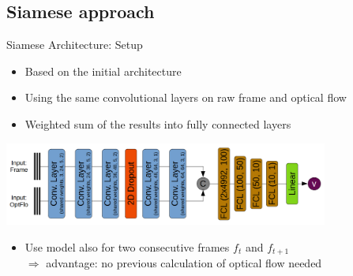 \subsection{Siamese approach}

\begin{frame}{Siamese Architecture: Setup}
	\begin{itemize}
		\item Based on the initial architecture
		\item Using the same convolutional layers on raw frame and optical flow
		\item Weighted sum of the results into fully connected layers
	\end{itemize}
	\begin{center}
	\includegraphics[width=0.8\textwidth]{imgs/siamese_model.png}
	\end{center}
	\begin{itemize}
		\item Use model also for two consecutive frames $f_t$ and $f_{t+1}$\\
		$\Rightarrow$ advantage: no previous calculation of optical flow needed
	\end{itemize}
\end{frame}

